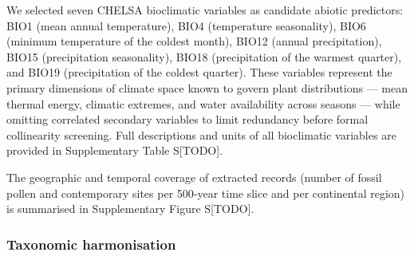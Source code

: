 \documentclass[
  12pt,
]{article}
\begin{document}
We selected seven CHELSA bioclimatic variables as candidate abiotic
predictors: BIO1 (mean annual temperature), BIO4 (temperature
seasonality), BIO6 (minimum temperature of the coldest month), BIO12
(annual precipitation), BIO15 (precipitation seasonality), BIO18
(precipitation of the warmest quarter), and BIO19 (precipitation of the
coldest quarter). These variables represent the primary dimensions of
climate space known to govern plant distributions --- mean thermal
energy, climatic extremes, and water availability across seasons ---
while omitting correlated secondary variables to limit redundancy before
formal collinearity screening. Full descriptions and units of all
bioclimatic variables are provided in Supplementary Table S{[}TODO{]}.

The geographic and temporal coverage of extracted records (number of
fossil pollen and contemporary sites per 500-year time slice and per
continental region) is summarised in Supplementary Figure S{[}TODO{]}.

\subsubsection{Taxonomic harmonisation}\label{taxonomic-harmonisation}
\end{document}
